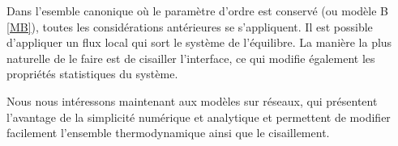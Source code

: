 Dans l'esemble canonique où le paramètre d'ordre est conservé (ou modèle B \ref{MB}), toutes les considérations antérieures se s'appliquent. Il est possible d'appliquer un flux local qui sort le système de l'équilibre. La manière la plus naturelle de le faire est de cisailler l'interface, ce qui modifie également les propriétés statistiques du système. 

Nous nous intéressons maintenant aux modèles sur réseaux, qui présentent l'avantage de la simplicité numérique et analytique et permettent de modifier facilement l'ensemble thermodynamique ainsi que le cisaillement. 